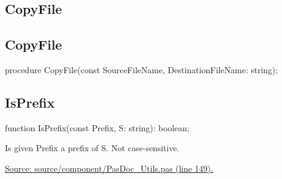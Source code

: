 \documentclass{report}
\newif\ifpdf
\begin{document}
\subsection*{\large{\textbf{CopyFile}}\normalsize\hspace{1ex}\hrulefill}
\else
\subsection*{CopyFile}
\fi
\label{PasDoc_Utils-CopyFile}
\begin{list}{}{
\setlength{\itemindent}{0cm}
\setlength{\listparindent}{0cm}
\setlength{\leftmargin}{\evensidemargin}
\addtolength{\leftmargin}{\tmplength}
\settowidth{\labelsep}{X}
\addtolength{\leftmargin}{\labelsep}
\setlength{\labelwidth}{\tmplength}
}
\item[\textbf{Declaration}\hfill]
\ifpdf
\begin{flushleft}
\fi
\begin{ttfamily}
procedure CopyFile(const SourceFileName, DestinationFileName: string);\end{ttfamily}

\ifpdf
\end{flushleft}
\fi

\end{list}
\ifpdf
\subsection*{\large{\textbf{IsPrefix}}\normalsize\hspace{1ex}\hrulefill}
\else
\subsection*{IsPrefix}
\fi
\label{PasDoc_Utils-IsPrefix}
\begin{list}{}{
\setlength{\itemindent}{0cm}
\setlength{\listparindent}{0cm}
\setlength{\leftmargin}{\evensidemargin}
\addtolength{\leftmargin}{\tmplength}
\settowidth{\labelsep}{X}
\addtolength{\leftmargin}{\labelsep}
\setlength{\labelwidth}{\tmplength}
}
\item[\textbf{Declaration}\hfill]
\ifpdf
\begin{flushleft}
\fi
\begin{ttfamily}
function IsPrefix(const Prefix, S: string): boolean;\end{ttfamily}

\ifpdf
\end{flushleft}
\fi

\par
\item[\textbf{Description}]
Is given Prefix a prefix of S. Not case{-}sensitive.\par
\href{https://github.com/pasdoc/pasdoc/blob/master/source/component/PasDoc_Utils.pas#L149}{Source: source/component/PasDoc{\_}Utils.pas (line 149).}

\end{list}
\ifpdf
\end{document}
